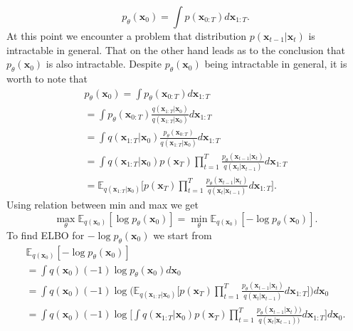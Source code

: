 \documentclass[10pt]{article}
\begin{document}
\begin{equation}
    p_{\theta}( \textbf{x}_{0} ) = \int p( \textbf{x}_{0:T}  ) d\textbf{x}_{1:T}.
\end{equation}
At this point we encounter a problem that distribution $ p( \textbf{x}_{t-1}|  \textbf{x}_{t }  )$ is intractable in general. That on the other hand leads as to the conclusion that $p_{\theta}( \textbf{x}_{0})$ is also intractable. Despite  $ p_{\theta}( \textbf{x}_{0} )$ being intractable in general, it is worth to note that
\begin{gather}
     p_{\theta}( \textbf{x}_{0} ) = \int p_{\theta}( \textbf{x}_{0:T}  ) d\textbf{x}_{1:T} \\
     = \int p_{\theta}( \textbf{x}_{0:T}  )  \frac{q(\textbf{x}_{1:T}|\textbf{x}_{0})}{q(\textbf{x}_{1:T}|\textbf{x}_{0})} d\textbf{x}_{1:T} \\
     =\int q(\textbf{x}_{1:T}|\textbf{x}_{0})  \frac{p_{\theta}( \textbf{x}_{0:T}  ) }{q(\textbf{x}_{1:T}|\textbf{x}_{0})} d\textbf{x}_{1:T} \\
     =\int q(\textbf{x}_{1:T}|\textbf{x}_{0}) p( \textbf{x}_{T}  )  \prod_{t=1}^{T}
     \frac{ p_{\theta}( \textbf{x}_{t-1}|  \textbf{x}_{t }  )   }
            { q( \textbf{x}_{t}|  \textbf{x}_{t -1 }  )} d\textbf{x}_{1:T} \\
    =  \mathbb{E}_{q(\textbf{x}_{1:T}|\textbf{x}_{0})}
    \Bigg[
    p( \textbf{x}_{T}  )  \prod_{t=1}^{T}
     \frac{ p_{\theta}( \textbf{x}_{t-1}|  \textbf{x}_{t }  )   }
     { q( \textbf{x}_{t}|  \textbf{x}_{t -1 }  )} d\textbf{x}_{1:T} 
    \Bigg].
\end{gather}
Using relation between min and max we get
\begin{equation}
    \max_{\theta}\mathbb{E}_{q(\textbf{x}_{0})} [\log  p_{\theta}( \textbf{x}_{0}) ] = 
    \min_{\theta}\mathbb{E}_{q(\textbf{x}_{0})} [-\log  p_{\theta}( \textbf{x}_{0}) ].
\end{equation}
To find ELBO for $ -\log  p_{\theta}( \textbf{x}_{0})$ we start from
\begin{gather}
    \mathbb{E}_{q(\textbf{x}_{0})} [-\log  p_{\theta}( \textbf{x}_{0}) ] \\
    = \int q( \textbf{x}_{0})(-1)\log  p_{\theta}( \textbf{x}_{0})d \textbf{x}_{0} \\
    = \int q( \textbf{x}_{0})(-1)\log 
    \Bigg(  \mathbb{E}_{q(\textbf{x}_{1:T}|\textbf{x}_{0})} \Bigg[
        p( \textbf{x}_{T}  )  \prod_{t=1}^{T}
     \frac{ p_{\theta}( \textbf{x}_{t-1}|  \textbf{x}_{t }  )   }
     { q( \textbf{x}_{t}|  \textbf{x}_{t -1 }  )} d\textbf{x}_{1:T}  \Bigg]
     \Bigg) d \textbf{x}_{0} \\
    = \int q( \textbf{x}_{0})(-1)\log
    \Bigg[
        \int q(\textbf{x}_{1:T}|\textbf{x}_{0}) p( \textbf{x}_{T}  )  \prod_{t=1}^{T}
         \frac{ p_{\theta}( \textbf{x}_{t-1}|  \textbf{x}_{t }  )  ) }
        { q( \textbf{x}_{t}|  \textbf{x}_{t -1 }  ))} d\textbf{x}_{1:T}
    \Bigg] 
    d \textbf{x}_{0}.
\end{gather}
\end{document}
